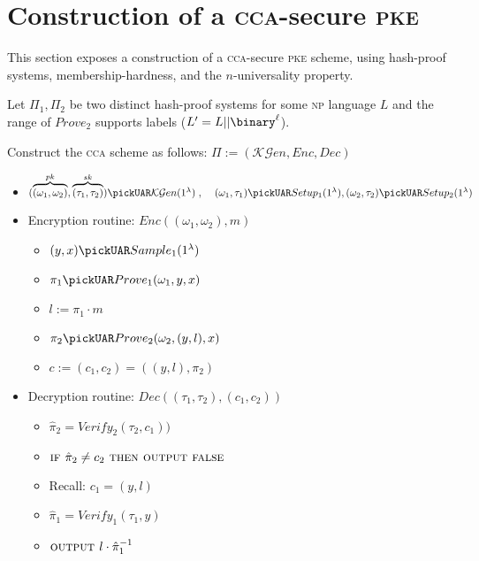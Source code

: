 
\section{Construction of a \textsc{cca}-secure \textsc{pke}}

This section exposes a construction of a \textsc{cca}-secure \textsc{pke} scheme, using hash-proof systems, membership-hardness, and the $n$-universality property.

Let $\Pi_1, \Pi_2$ be two distinct hash-proof systems for some \textsc{np} language $L$ and the range of $Prove_2$ supports labels ($L'=L||\binary^\ell$).

Construct the \textsc{cca} scheme as follows: $\Pi := (\mathcal{KG}en, Enc, Dec)$
\begin{itemize}
    \item $ (\overbrace{(\omega_1,\omega_2)}^{pk}, \overbrace{(\tau_1,\tau_2)}^{sk}) \pickUAR \mathcal{KG}en(1^\lambda)\;,\;\;\;\;(\omega_1, \tau_1) \pickUAR Setup_1(1^\lambda), (\omega_2, \tau_2) \pickUAR Setup_2(1^\lambda)$
    \item Encryption routine: $Enc((\omega_1, \omega_2), m)$
    \begin{itemize}
        \item $ (y, x) \pickUAR Sample_1(1^\lambda)$
        \item $ \pi_1 \pickUAR Prove_1(\omega_1, y, x)$
        \item $ l := \pi_1 \cdot m$
        \item $ \pi_2 \pickUAR Prove_2(\omega_2, (y, l), x)$
        \item $ c := (c_1, c_2) = ((y, l), \pi_2)$
    \end{itemize}
    \item Decryption routine: $Dec((\tau_1, \tau_2), (c_1, c_2))$
    \begin{itemize}
        \item $\hat{\pi}_2 = Verify_2(\tau_2, c_1))$
        \item $\textsc{if } \hat{\pi}_2 \neq c_2 \textsc{ then output false}$
        \item Recall: $c_1 = (y, l)$
        \item $\hat{\pi}_1 = Verify_1(\tau_1, y)$
        \item $\textsc{output } l \cdot \hat{\pi}_1^{-1}$
    \end{itemize}
\end{itemize}

